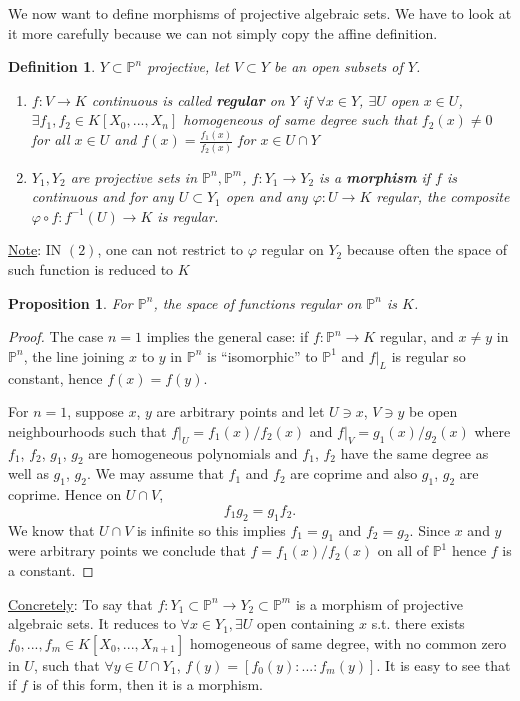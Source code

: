 \documentclass[11pt]{article}
\newtheorem{prop}[thm]{Proposition}
\newtheorem{dfn}[thm]{Definition}
\newcommand{\proj}{\mathbb P}
\newcommand{\lrta}{\longrightarrow}
\begin{document}
We now want to define morphisms of  projective algebraic sets. We have to look at it more carefully because we can not simply copy the affine definition.
\begin{dfn}
$Y\subset \proj^n$ projective, let $V\subset Y $ be an open subsets of $Y$.
\begin{enumerate}[label=(\arabic*)]
\item $f: V\lrta K$ continuous is called \textbf{regular} on $Y$ if $\forall x\in Y$, $\exists U$ open $x\in U$, $\exists f_1,f_2\in K[X_0,...,X_n]$ homogeneous of same degree such that $f_2(x)\neq 0$ for all $x\in U$ and $f(x)=\frac{f_1(x)}{f_2(x)}$ for $x\in U\cap Y$
\item $Y_1,Y_2$ are projective sets in $\proj^n,\proj^m$, $f: Y_1\lrta Y_2$ is a \textbf{morphism} if $f$ is continuous and for any $U\subset Y_1$ open and any $\varphi:U\lrta K$ regular, the composite $\varphi\circ f: f^{-1}(U)\lrta K$ is regular.
\end{enumerate}
\end{dfn}
\underline{Note}: IN $(2)$, one can not restrict to $\varphi$ regular on $Y_2$ because often the space of such function is reduced to $K$
\begin{prop}
For $\proj^n$, the space of functions regular on $\proj^n$ is $K$.
\end{prop}
\begin{proof}
The case $n=1$ implies the general case: if $f:\proj^n\lrta K$ regular, and $x\neq y$ in $\proj^n$, the line joining $x$ to $y$ in $\proj^n$ is ``isomorphic'' to $\proj^1$ and $f|_L$ is regular so constant, hence $f(x)=f(y)$.

For $n=1$, suppose $x$, $y$ are arbitrary points and let $U \ni x$, $V\ni y$ be open neighbourhoods such that $f|_U =f_1(x)/f_2(x)$ and $f|_V = g_1(x)/g_2(x)$ where $f_1$, $f_2$, $g_1$, $g_2$ are homogeneous polynomials and $f_1$, $f_2$ have the same degree as well as $g_1$, $g_2$. We may assume that $f_1$ and $f_2$ are coprime and also $g_1$, $g_2$ are coprime. Hence on $U \cap V$,
$$
f_1 g_2 = g_1 f_2.
$$
We know that $U \cap V$ is infinite so this implies $f_1 = g_1$ and $ f_2 = g_2$. Since $x$ and $y$ were arbitrary points we conclude that $f = f_1(x)/f_2(x)$ on all of $\proj^1$ hence $f$ is a constant.
\end{proof}
\underline{Concretely}: To say that $f: Y_1\subset \proj^n\lrta Y_2\subset \proj^m$  is a morphism of projective algebraic sets. It reduces to 
$\forall x\in Y_1,\exists U$ open containing $x$ s.t. there exists $f_0,...,f_m\in K[X_0,...,X_{n+1}]$
homogeneous of same degree, with no common zero in $U$, such that
$\forall y\in U\cap Y_1$, $f(y)=[f_0(y):...:f_m(y)]$. It is easy to see that if $f$ is of this form, then it is a morphism.
\end{document}
